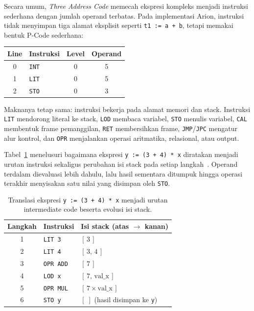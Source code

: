 \documentclass[11pt,a4paper]{article}
\begin{document}
Secara umum, \textit{Three Address Code} memecah ekspresi kompleks menjadi
instruksi sederhana dengan jumlah operand terbatas. Pada implementasi Arion,
instruksi tidak menyimpan tiga alamat eksplisit seperti \texttt{t1 := a + b},
tetapi memakai bentuk P-Code sederhana:

\begin{center}
\begin{tabular}{c l c c}
\toprule
\textbf{Line} & \textbf{Instruksi} & \textbf{Level} & \textbf{Operand} \\
\midrule
0 & \texttt{INT} & 0 & 5 \\
1 & \texttt{LIT} & 0 & 5 \\
2 & \texttt{STO} & 0 & 3 \\
\bottomrule
\end{tabular}
\end{center}

Maknanya tetap sama: instruksi bekerja pada alamat memori dan stack. Instruksi
\texttt{LIT} mendorong literal ke stack, \texttt{LOD} membaca variabel,
\texttt{STO} menulis variabel, \texttt{CAL} membentuk frame pemanggilan,
\texttt{RET} membersihkan frame, \texttt{JMP}/\texttt{JPC} mengatur alur
kontrol, dan \texttt{OPR} menjalankan operasi aritmatika, relasional, atau
output.

Tabel~\ref{tab:icseq} menelusuri bagaimana ekspresi \texttt{y := (3 + 4) * x}
diratakan menjadi urutan instruksi sekaligus perubahan isi stack pada setiap
langkah~\cite{guidebook}. Operand terdalam dievaluasi lebih dahulu, lalu hasil
sementara ditumpuk hingga operasi terakhir menyisakan satu nilai yang disimpan
oleh \texttt{STO}.

\begin{table}[H]
\centering
\footnotesize
\begin{tabular}{c l l}
\toprule
\textbf{Langkah} & \textbf{Instruksi} & \textbf{Isi stack (atas $\rightarrow$ kanan)} \\
\midrule
1 & \texttt{LIT 3}   & $[\,3\,]$ \\
2 & \texttt{LIT 4}   & $[\,3,\,4\,]$ \\
3 & \texttt{OPR ADD} & $[\,7\,]$ \\
4 & \texttt{LOD x}   & $[\,7,\,\text{val\_x}\,]$ \\
5 & \texttt{OPR MUL} & $[\,7 \times \text{val\_x}\,]$ \\
6 & \texttt{STO y}   & $[\;]$ \quad (hasil disimpan ke \texttt{y}) \\
\bottomrule
\end{tabular}
\caption{Translasi ekspresi \texttt{y := (3 + 4) * x} menjadi urutan
intermediate code beserta evolusi isi stack.}
\label{tab:icseq}
\end{table}
\end{document}
